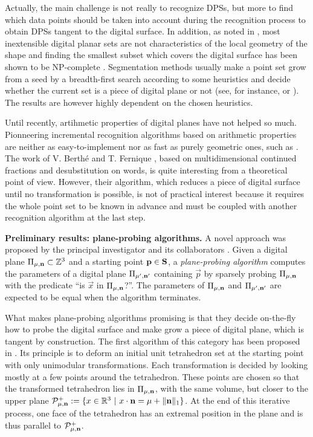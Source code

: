 Actually, the main challenge is not really to recognize DPSs, but more to find which data points
should be taken into account during the recognition process to obtain DPSs tangent to the digital
surface. In addition, as noted in \cite{Charrier2011}, most inextensible digital planar sets are not
characteristics of the local geometry of the shape and finding the smallest subset which covers
the digital surface has been shown to be NP-complete \cite{Sivignon2009}.
Segmentation methods usually make a point set grow from a seed by a breadth-first search according
to some heuristics and decide whether the current set is a piece of digital plane or not
(see, for instance, \cite{Klette2001} or \cite{Sivignon2004}). 
The results are however highly dependent on the chosen heuristics.   

Until recently, artihmetic properties of digital planes have not helped so much.
Pionneering incremental recognition algorithms based on arithmetic properties
\cite{Debled1994,Mesmoudi2002} are neither as easy-to-implement nor as fast as
purely geometric ones, such as \cite{Gerard2005}.  
The work of V. Berth\'{e} and T. Fernique \cite{Fernique2009,Berthe2011}, 
based on multidimensional continued fractions and desubstitution on words,
is quite interesting from a theoretical point of view. However, their algorithm,
which reduces a piece of digital surface until no transformation is possible,
is not of practical interest because it requires the whole point set to be known
in advance and must be coupled with another recognition algorithm at the last step.  

\noindent\textbf{Preliminary results: plane-probing algorithms.}
A novel approach was proposed by the principal investigator and its collaborators
\cite{LPRTCS2016, LPRDGCI2016, LPRJMIV2017}. 
Given a digital plane $\Pi_{\mu,\mathbf{n}} \subset {\ensuremath\mathbb{Z}}^3$
and a starting point $\mathbf{p} \in \mathbf{S}$, 
a \emph{plane-probing algorithm} computes the parameters of a digital plane $\Pi_{\mu',\mathbf{n}'}$
containing $\vec{p}$ by sparsely probing $\Pi_{\mu,\mathbf{n}}$ with the predicate
``is $\vec{x}$ in $\Pi_{\mu,\mathbf{n}}$?''. The parameters of $\Pi_{\mu,\mathbf{n}}$
and $\Pi_{\mu',\mathbf{n}'}$ are expected to be equal when the algorithm terminates.

What makes plane-probing algorithms promising is that they decide on-the-fly how
to probe the digital surface and make grow a piece of digital plane, which is
tangent by construction. 
The first algorithm of this category has been proposed in \cite{LPRTCS2016}.
Its principle is to deform an initial unit tetrahedron set at the starting point
with only unimodular transformations. Each transformation is decided by looking
mostly at a few points around the tetrahedron. These points are chosen so that
the transformed tetrahedron lies in $\Pi_{\mu,\mathbf{n}}$, with the same volume,
but closer to the upper plane
$\mathcal{P}^{+}_{\mu,\mathbf{n}} := \{ x \in {\ensuremath\mathbb{R}}^3 \ | \ x \cdot \mathbf{n} = \mu + \|\mathbf{n}\|_1 \}$.
At the end of this iterative process, one face of the tetrahedron has an extremal
position in the plane and is thus parallel to $\mathcal{P}^{+}_{\mu,\mathbf{n}}$.

